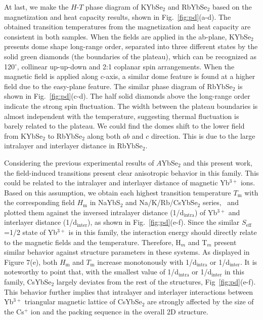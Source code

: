 \documentclass[%
 aip,
 amsmath,amssymb,
 reprint,%
]{revtex4-1}
\begin{document}
At last, we make the $H$-$T$ phase diagram of KYbSe$_2$ and RbYbSe$_2$ based on the magnetization and heat capacity results, shown in Fig.~\ref{fig:pd}(a-d). The obtained transition temperatures from the magnetization and heat capacity are consistent in both samples. When the fields are applied in the ab-plane, KYbSe$_2$ presents dome shape long-range order, separated into three different states by the solid green diamonds (the boundaries of the plateau), which can be recognized as 120$^\circ$, collinear up-up-down and 2:1 coplanar spin arrangements. When the magnetic field is applied along c-axis, a similar dome feature is found at a higher field due to the easy-plane feature. The similar phase diagram of RbYbSe$_2$ is shown in Fig.~\ref{fig:pd}(c-d). The half solid diamonds above the long-range order indicate the strong spin fluctuation. The width between the plateau boundaries is almost independent with the temperature, suggesting thermal fluctuation is barely related to the plateau. We could find the domes shift to the lower field from KYbSe$_2$ to RbYbSe$_2$ along both $ab$ and $c$ direction. This is due to the large intralayer and interlayer distance in RbYbSe$_2$.

Considering the previous experimental results of $A$YbSe$_2$ and this present work, the field-induced transitions present clear anisotropic behavior in this family. This could be related to the intralayer and interlayer distance of magnetic Yb$^{3+}$ ions. Based on this assumption, we obtain each highest transition temperature $T_\mathrm{m}$ with the corresponding field $H_\mathrm{m}$ in NaYbS$_2$ and Na/K/Rb/CsYbSe$_2$ series,~\cite{Ranjith2019naybse,PhysRevB.100.220407,ma2020spin} and plotted them against the inversed intralayer distance (1/d$_\mathrm{intra}$) of Yb$^{3+}$ and interlayer distance (1/d$_\mathrm{inter}$), as shown in Fig.~\ref{fig:pd}(e-f). Since the similar $S_{\mathrm{eff}}$=1/2 state of Yb$^{3+}$ is in this family, the interaction energy should directly relate to the magnetic fields and the temperature. Therefore, H$_m$ and T$_m$ present similar behavior against structure parameters in these systems. As displayed in Figure 7(e), both  $H_\mathrm{m}$ and $T_\mathrm{m}$ increase monotonously with 1/d$_\mathrm{intra}$ or 1/d$_\mathrm{inter}$. It is noteworthy to point that, with the smallest value of 1/d$_\mathrm{intra}$ or 1/d$_\mathrm{inter}$ in this family, CsYbSe$_2$ largely deviates from the rest of the structures, Fig~\ref{fig:pd}(e-f). This behavior further implies that intralayer and interlayer interactions between Yb$^{3+}$ triangular magnetic lattice of CsYbSe$_2$ are strongly affected by the size of the Cs$^+$ ion and the packing sequence in the overall 2D structure.
\end{document}

